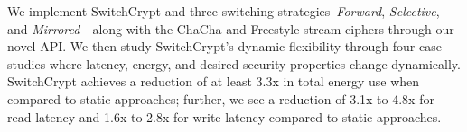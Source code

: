 We implement SwitchCrypt and three switching strategies--\emph{Forward},
\emph{Selective}, and \emph{Mirrored}---along with the ChaCha and Freestyle
stream ciphers through our novel API. We then study SwitchCrypt's dynamic
flexibility through four case studies where latency, energy, and desired
security properties change dynamically. SwitchCrypt achieves a reduction of at
least 3.3x in total energy use when compared to static approaches; further, we
see a reduction of 3.1x to 4.8x for read latency and 1.6x to 2.8x for write
latency compared to static approaches.
